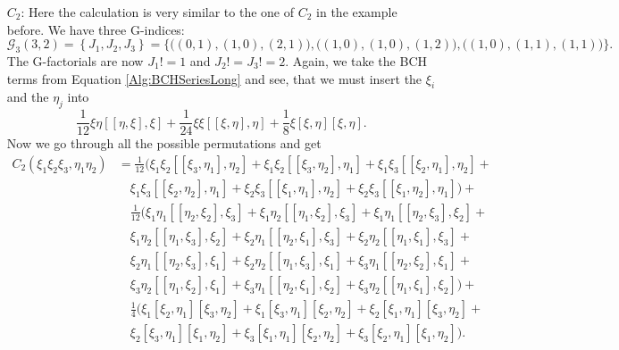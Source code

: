 \begin{itemize}
	\item[$C_2$:]
	Here the calculation is very similar to the one of $C_2$ in the example 
	before. We have three G-indices:
	\begin{equation*}
		\mathcal{G}_3(3,2) 
		=
		\left\{
			J_1, J_2, J_3
		\right\}
		= 
		\big\{ 
			\big( (0,1), (1,0), (2,1) \big), 
			\big( (1,0), (1,0), (1,2) \big), 
			\big( (1,0), (1,1), (1,1) \big) 
		\big\}.
	\end{equation*}
	The G-factorials are now $J_1! = 1$ and $J_2! = J_3! = 2$. Again, we take 
	the BCH terms from Equation \eqref{Alg:BCHSeriesLong} and see, that we 
	must insert the $\xi_i$ and the $\eta_j$ into
	\begin{equation*}
		\frac{1}{12} \xi \eta [[\eta, \xi], \xi] +
		\frac{1}{24} \xi \xi [[\xi, \eta], \eta] +
		\frac{1}{8} \xi [\xi, \eta] [\xi, \eta].
	\end{equation*}
	Now we go through all the possible permutations and get
	\begin{align*}
		C_2(\xi_1 \xi_2 \xi_3, \eta_1 \eta_2) 
		& = 
		\frac{1}{12} 
		\big( 
			\xi_1 \xi_2 [[\xi_3, \eta_1], \eta_2] + 
			\xi_1 \xi_2 [[\xi_3, \eta_2], \eta_1] + 
			\xi_1 \xi_3 [[\xi_2, \eta_1], \eta_2] +
		\\
		& \quad 
			\xi_1 \xi_3 [[\xi_2, \eta_2], \eta_1] + 
			\xi_2 \xi_3 [[\xi_1, \eta_1], \eta_2] + 
			\xi_2 \xi_3 [[\xi_1, \eta_2], \eta_1] 
		\big) +
		\\ 
		& \quad
		\frac{1}{12} 
		\big( 
			\xi_1 \eta_1 [[\eta_2, \xi_2], \xi_3] + 
			\xi_1 \eta_2 [[\eta_1, \xi_2], \xi_3] + 
			\xi_1 \eta_1 [[\eta_2, \xi_3], \xi_2] +
		\\
		& \quad
			\xi_1 \eta_2 [[\eta_1, \xi_3], \xi_2] + 
			\xi_2 \eta_1 [[\eta_2, \xi_1], \xi_3] + 
			\xi_2 \eta_2 [[\eta_1, \xi_1], \xi_3] +
		\\
		& \quad
			\xi_2 \eta_1 [[\eta_2, \xi_3], \xi_1] + 
			\xi_2 \eta_2 [[\eta_1, \xi_3], \xi_1] + 
			\xi_3 \eta_1 [[\eta_2, \xi_2], \xi_1] +
		\\
		& \quad
			\xi_3 \eta_2 [[\eta_1, \xi_2], \xi_1] + 
			\xi_3 \eta_1 [[\eta_2, \xi_1], \xi_2] + 
			\xi_3 \eta_2 [[\eta_1, \xi_1], \xi_2] 
		\big) +
		\\
		& \quad
		\frac{1}{4} 
		\big( 
			\xi_1 [\xi_2, \eta_1] [\xi_3, \eta_2] + 
			\xi_1 [\xi_3, \eta_1] [\xi_2, \eta_2] + 
			\xi_2 [\xi_1, \eta_1] [\xi_3, \eta_2] + 
		\\
		& \quad
			\xi_2 [\xi_3, \eta_1] [\xi_1, \eta_2] + 
			\xi_3 [\xi_1, \eta_1] [\xi_2, \eta_2] + 
			\xi_3 [\xi_2, \eta_1] [\xi_1, \eta_2] 
 		\big).
	\end{align*}


\end{itemize}
